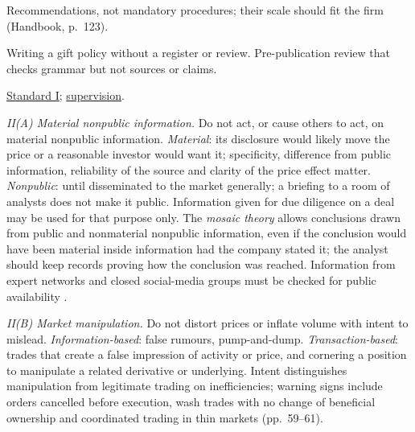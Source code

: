 \begin{qfmethod}
 Recommendations, not mandatory procedures; their scale should fit the firm (Handbook, p.~123).

 Writing a gift policy without a register or review. Pre-publication review that checks grammar but not sources or claims.

 \hyperref[rule:standard-professionalism]{Standard I}; \hyperref[meth:preventing-employer-duty-violations]{supervision}.

\end{qfmethod}

\begin{qfrule}\label{rule:standard-market-integrity}
 \emph{II(A) Material nonpublic information.} Do not act, or cause others to act, on material nonpublic information. \emph{Material}: its disclosure would likely move the price or a reasonable investor would want it; specificity, difference from public information, reliability of the source and clarity of the price effect matter. \emph{Nonpublic}: until disseminated to the market generally; a briefing to a room of analysts does not make it public. Information given for due diligence on a deal may be used for that purpose only. The \emph{mosaic theory} allows conclusions drawn from public and nonmaterial nonpublic information, even if the conclusion would have been material inside information had the company stated it; the analyst should keep records proving how the conclusion was reached. Information from expert networks and closed social-media groups must be checked for public availability \citep[pp.~47--52]{standards-practice-handbook-2024}.

\emph{II(B) Market manipulation.} Do not distort prices or inflate volume with intent to mislead. \emph{Information-based}: false rumours, pump-and-dump. \emph{Transaction-based}: trades that create a false impression of activity or price, and cornering a position to manipulate a related derivative or underlying. Intent distinguishes manipulation from legitimate trading on inefficiencies; warning signs include orders cancelled before execution, wash trades with no change of beneficial ownership and coordinated trading in thin markets (pp.~59--61).


\end{qfrule}
